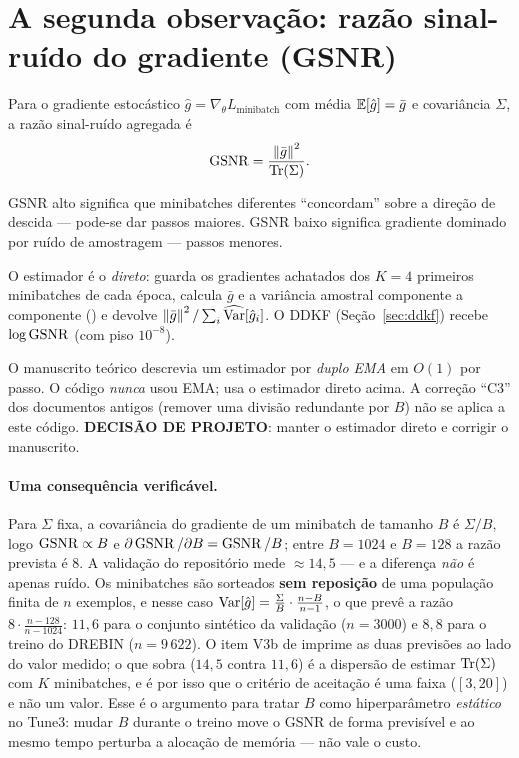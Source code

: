 \section{A segunda observação: razão sinal-ruído do gradiente (GSNR)}\label{sec:gsnr}

\begin{definicao}
Para o gradiente estocástico $\hat g=\nabla_\theta L_{\text{minibatch}}$ com média $\mathbb{E}[\hat g]=\bar g$ e covariância $\Sigma$, a razão sinal-ruído agregada é
\[
\operatorname{GSNR}=\frac{\left\lVert \bar g \right\rVert^2}{\operatorname{Tr}(\Sigma)} .
\]
\end{definicao}
GSNR alto significa que minibatches diferentes ``concordam'' sobre a direção de descida --- pode-se dar passos maiores. GSNR baixo significa gradiente dominado por ruído de amostragem --- passos menores.

\begin{codigo}
O estimador é o \emph{direto}: guarda os gradientes achatados dos $K=4$ primeiros minibatches de cada época, calcula $\bar g$ e a variância amostral componente a componente () e devolve $\left\lVert \bar g \right\rVert^2/\sum_i\widehat{\operatorname{Var}}[\hat g_i]$. O DDKF (Seção~\ref{sec:ddkf}) recebe $\log\operatorname{GSNR}$ (com piso $10^{-8}$).
\end{codigo}

\begin{observacao}
O manuscrito teórico descrevia um estimador por \emph{duplo EMA} em $O(1)$ por passo. O código \emph{nunca} usou EMA; usa o estimador direto acima. A correção ``C3'' dos documentos antigos (remover uma divisão redundante por $B$) não se aplica a este código. \textbf{DECISÃO DE PROJETO}: manter o estimador direto e corrigir o manuscrito.
\end{observacao}

\paragraph{Uma consequência verificável.} Para $\Sigma$ fixa, a covariância do gradiente de um minibatch de tamanho $B$ é $\Sigma/B$, logo $\operatorname{GSNR}\propto B$ e $\partial\operatorname{GSNR}/\partial B=\operatorname{GSNR}/B$; entre $B=1024$ e $B=128$ a razão prevista é $8$. A validação do repositório mede $\approx14{,}5$ --- e a diferença \emph{não} é apenas ruído. Os minibatches são sorteados \textbf{sem reposição} de uma população finita de $n$ exemplos, e nesse caso $\operatorname{Var}[\hat g]=\frac{\Sigma}{B}\cdot\frac{n-B}{n-1}$, o que prevê a razão $8\cdot\frac{n-128}{n-1024}$: $11{,}6$ para o conjunto sintético da validação ($n=3000$) e $8{,}8$ para o treino do DREBIN ($n=9\,622$). O item V3b de  imprime as duas previsões ao lado do valor medido; o que sobra ($14{,}5$ contra $11{,}6$) é a dispersão de estimar $\operatorname{Tr}(\Sigma)$ com $K$ minibatches, e é por isso que o critério de aceitação é uma faixa ($[3,20]$) e não um valor. Esse é o argumento para tratar $B$ como hiperparâmetro \emph{estático} no Tune3: mudar $B$ durante o treino move o GSNR de forma previsível e ao mesmo tempo perturba a alocação de memória --- não vale o custo.

